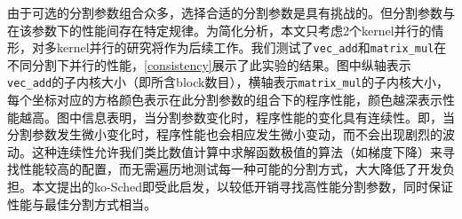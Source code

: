 由于可选的分割参数组合众多，选择合适的分割参数是具有挑战的。但分割参数与在该参数下的性能间存在特定规律。为简化分析，本文只考虑2个kernel并行的情形，对多kernel并行的研究将作为后续工作。我们测试了\texttt{vec\_add}和\texttt{matrix\_mul}在不同分割下并行的性能，\autoref{consistency}展示了此实验的结果。图中纵轴表示\texttt{vec\_add}的子内核大小（即所含block数目），横轴表示\texttt{matrix\_mul}的子内核大小，每个坐标对应的方格颜色表示在此分割参数的组合下的程序性能，颜色越深表示性能越高。图中信息表明，当分割参数变化时，程序性能的变化具有连续性。即，当分割参数发生微小变化时，程序性能也会相应发生微小变动，而不会出现剧烈的波动。这种连续性允许我们类比数值计算中求解函数极值的算法（如梯度下降）来寻找性能较高的配置，而无需遍历地测试每一种可能的分割方式，大大降低了开发负担。本文提出的ko-Sched即受此启发，以较低开销寻找高性能分割参数，同时保证性能与最佳分割方式相当。